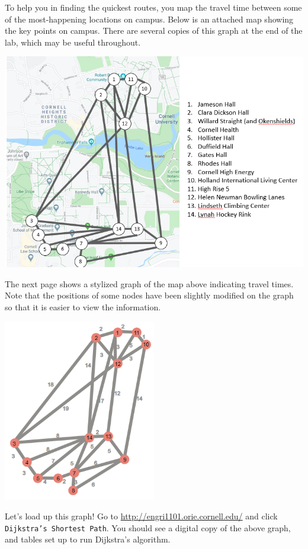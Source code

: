 \documentclass[twoside]{article}%
\begin{document}
To help you in finding the quickest routes, you map the travel time between some of the most-happening locations on campus.  Below is an attached map showing the key points on campus.  There are several copies of this graph at the end of the lab, which may be useful throughout. 

\begin{center}
\includegraphics[width=0.8 \textwidth]{campusmap.png}
\end{center}

The next page shows a stylized graph of the map above indicating travel times. Note that the positions of some nodes have been slightly modified on the graph so that it is easier to view the information.

\newpage

\begin{center}
\includegraphics[width=0.5\textwidth]{Graph.png}
\end{center}

\bigskip

\noindent

Let's load up this graph!  Go to \url{http://engri1101.orie.cornell.edu/} and click \texttt{Dijkstra's Shortest Path}. You should see a digital copy of the above graph, and tables set up to run Dijkstra's algorithm.  
\end{document}

